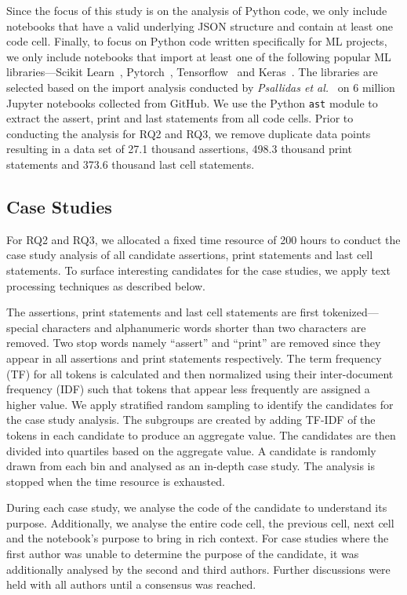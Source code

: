 Since the focus of this study is on the analysis of Python code, we only include notebooks that have a valid underlying JSON structure and contain at least one code cell. Finally, to focus on Python code written specifically for ML projects, we only include notebooks that import at least one of the following popular ML libraries---Scikit Learn~\cite{virtanen2020scipy}, Pytorch~\cite{paszke2017automatic}, Tensorflow~\cite{abadi2015tensorflow} and Keras~\cite{chollet2015keras}. The libraries are selected based on the import analysis conducted by \emph{Psallidas et al.}~\cite{psallidas2019data} on 6 million Jupyter notebooks collected from GitHub. We use the Python \lstinline{ast} module to extract the assert, print and last statements from all code cells. Prior to conducting the analysis for RQ2 and RQ3, we remove duplicate data points resulting in a data set of 27.1 thousand assertions, 498.3 thousand print statements and 373.6 thousand last cell statements.

\subsection{Case Studies}

For RQ2 and RQ3, we allocated a fixed time resource of 200 hours to conduct the case study analysis of all candidate assertions, print statements and last cell statements. To surface interesting candidates for the case studies, we apply text processing techniques as described below.

The assertions, print statements and last cell statements are first tokenized---special characters and alphanumeric words shorter than two characters are removed. Two stop words namely ``assert'' and ``print'' are removed since they appear in all assertions and print statements respectively. The term frequency (TF) for all tokens is calculated and then normalized using their inter-document frequency (IDF) such that tokens that appear less frequently are assigned a higher value. We apply stratified random sampling to identify the candidates for the case study analysis. The subgroups are created by adding TF-IDF of the tokens in each candidate to produce an aggregate value. The candidates are then divided into quartiles based on the aggregate value. A candidate is randomly drawn from each bin and analysed as an in-depth case study. The analysis is stopped when the time resource is exhausted. 

During each case study, we analyse the code of the candidate to understand its purpose. Additionally, we analyse the entire code cell, the previous cell, next cell and the notebook's purpose to bring in rich context. For case studies where the first author was unable to determine the purpose of the candidate, it was additionally analysed by the second and third authors. Further discussions were held with all authors until a consensus was reached.

